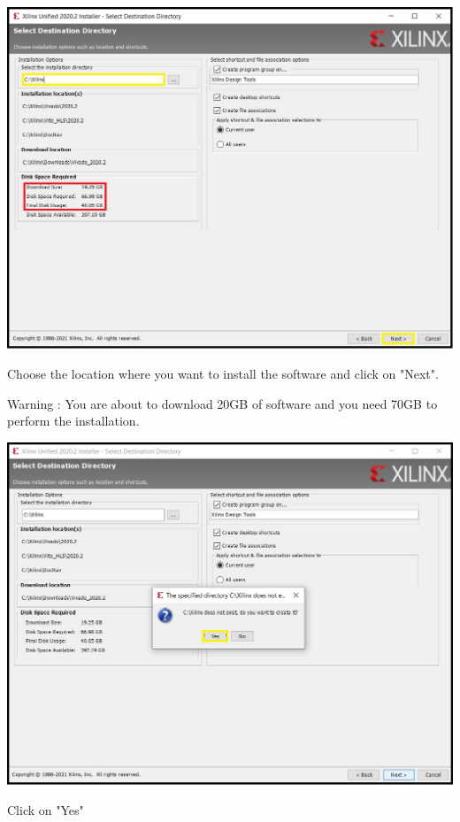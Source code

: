 \includegraphics[width=\linewidth]{images/VivadoInstimg014.jpg}

Choose the location where you want to install the software and click on "Next".

Warning : You are about to download 20GB of software and you need 70GB to perform the installation.

\includegraphics[width=\linewidth]{images/VivadoInstimg015.jpg}

Click on "Yes"

